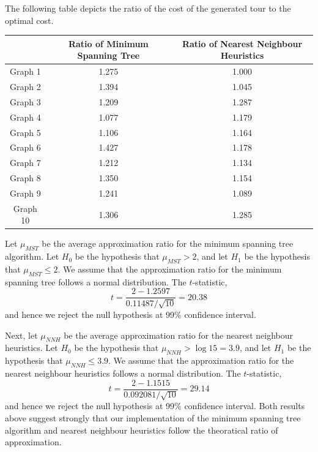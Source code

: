 \documentclass[paper=a4, fontsize=11pt]{scrartcl}	%
\numberwithin{equation}{section}		%
\numberwithin{figure}{section}			%
\numberwithin{table}{section}				%
\begin{document}
The following table depicts the ratio of the cost of the generated tour to the optimal cost.
\begin{center}
\begin{tabular}{|c|c|c|}
\hline 
 & Ratio of Minimum Spanning Tree & Ratio of Nearest Neighbour Heuristics\\ 
\hline 
Graph 1 & 1.275 & 1.000 \\ 
\hline 
Graph 2 & 1.394 & 1.045 \\ 
\hline 
Graph 3 & 1.209 & 1.287 \\ 
\hline 
Graph 4 & 1.077 & 1.179 \\ 
\hline 
Graph 5 & 1.106 & 1.164 \\ 
\hline 
Graph 6 & 1.427 & 1.178 \\ 
\hline 
Graph 7 & 1.212 & 1.134 \\ 
\hline 
Graph 8 & 1.350 & 1.154 \\ 
\hline 
Graph 9 & 1.241 & 1.089 \\ 
\hline 
Graph 10 & 1.306 & 1.285 \\ 
\hline 
\end{tabular} 
\end{center}
Let $\mu_{MST}$ be the average approximation ratio for the minimum spanning tree algorithm. Let $H_0$ be the hypothesis that $\mu_{MST} > 2$, and let $H_1$ be the hypothesis that $\mu_{MST} \le 2$. We assume that the approximation ratio for the minimum spanning tree follows a normal distribution. The $t$-statistic, 
\[t = \frac{2-1.2597}{0.11487/\sqrt{10}} = 20.38\]
and hence we reject the null hypothesis at 99\% confidence interval. 

Next, let $\mu_{NNH}$ be the average approximation ratio for the nearest neighbour heuristics. Let $H_0$ be the hypothesis that $\mu_{NNH} > \log{15} = 3.9$, and let $H_1$ be the hypothesis that $\mu_{NNH} \le 3.9$. We assume that the approximation ratio for the nearest neighbour heuristics follows a normal distribution. The $t$-statistic, 
\[t = \frac{2-1.1515}{0.092081/\sqrt{10}} = 29.14\]
and hence we reject the null hypothesis at 99\% confidence interval. Both results above suggest strongly that our implementation of the minimum spanning tree algorithm and nearest neighbour heuristics follow the theoratical ratio of approximation. 
\end{document}
